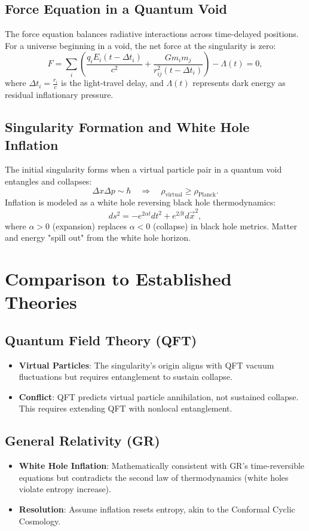 \documentclass{article}
\begin{document}
\subsection{Force Equation in a Quantum Void}
The force equation balances radiative interactions across time-delayed positions. For a universe beginning in a void, the net force at the singularity is zero:
\[
F = \sum_i \left( \frac{q_i E_i(t - \Delta t_i)}{c^2} + \frac{G m_i m_j}{r_{ij}^2(t - \Delta t_i)} \right) - \Lambda(t) = 0,
\]
where \( \Delta t_i = \frac{r_i}{c} \) is the light-travel delay, and \( \Lambda(t) \) represents dark energy as residual inflationary pressure.

\subsection{Singularity Formation and White Hole Inflation}
The initial singularity forms when a virtual particle pair in a quantum void entangles and collapses:
\[
\Delta x \Delta p \sim \hbar \quad \Rightarrow \quad \rho_{\text{virtual}} \geq \rho_{\text{Planck}}.
\]
Inflation is modeled as a white hole reversing black hole thermodynamics:
\[
ds^2 = -e^{2\alpha t} dt^2 + e^{2\beta t} d\vec{x}^2,
\]
where \( \alpha > 0 \) (expansion) replaces \( \alpha < 0 \) (collapse) in black hole metrics. Matter and energy "spill out" from the white hole horizon.

\section{Comparison to Established Theories}
\subsection{Quantum Field Theory (QFT)}
\begin{itemize}
    \item \textbf{Virtual Particles}: The singularity's origin aligns with QFT vacuum fluctuations but requires entanglement to sustain collapse.
    \item \textbf{Conflict}: QFT predicts virtual particle annihilation, not sustained collapse. This requires extending QFT with nonlocal entanglement.
\end{itemize}

\subsection{General Relativity (GR)}
\begin{itemize}
    \item \textbf{White Hole Inflation}: Mathematically consistent with GR's time-reversible equations but contradicts the second law of thermodynamics (white holes violate entropy increase).
    \item \textbf{Resolution}: Assume inflation resets entropy, akin to the Conformal Cyclic Cosmology.
\end{itemize}
\end{document}
